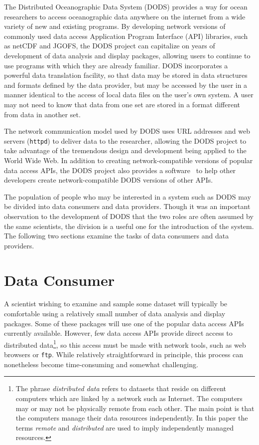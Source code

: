 The Distributed Oceanographic Data System (DODS) provides a way for
ocean researchers to access oceanographic data anywhere on the
internet from a wide variety of new and existing programs. By
developing network versions of commonly used data access Application
Program Interface (API) libraries, such as netCDF and JGOFS, the DODS
project can capitalize on years of development of data analysis and
display packages, allowing users to continue to use programs with
which they are already familiar. DODS incorporates a powerful data
translation facility, so that data may be stored in data structures
and formats defined by the data provider, but may be accessed by the
user in a manner identical to the access of local data files on the
user's own system. A user may not need to know that data from one set
are stored in a format different from data in another set.

The network communication model used by DODS uses URL addresses and
web servers ({\tt httpd}) to deliver data to the researcher, allowing
the DODS project to take advantage of the tremendous design and
development being applied to the World Wide Web. In addition to
creating network-compatible versions of popular data access APIs, the
DODS project also provides a software \toolkit\ to help other
developers create network-compatible DODS versions of other APIs.

The population of people who may be interested in a system such as
DODS may be divided into data consumers and data providers. Though it
was an important observation to the development of DODS that the two
roles are often assumed by the same scientists, the division is a
useful one for the introduction of the system. The following two
sections examine the tasks of data consumers and data providers.

\section{Data Consumer}

A scientist wishing to examine and sample some dataset will typically
be comfortable using a relatively small number of data analysis and
display packages. Some of these packages will use one of the popular
data access APIs currently available. However, few data access APIs
provide direct access to distributed data\footnote{The phrase {\em
distributed data\/} refers to datasets that reside on different
computers which are linked by a network such as Internet. The
computers may or may not be physically remote from each other. The
main point is that the computers manage their data resources
independently. In this paper the terms {\em remote\/} and {\em
distributed\/} are used to imply independently managed resources.}, so
this access must be made with network tools, such as web browsers or
{\tt ftp}. While relatively straightforward in principle, this process
can nonetheless become time-consuming and somewhat challenging.

